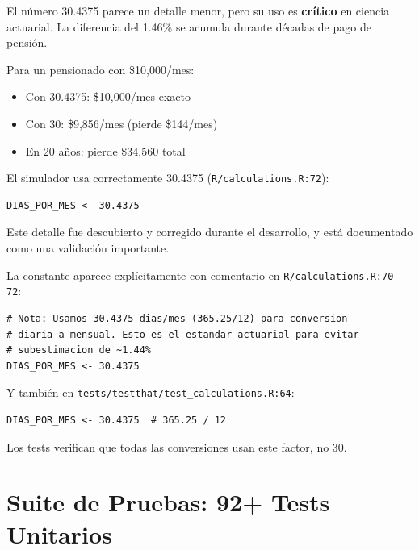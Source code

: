 \documentclass[11pt,a4paper]{report}
\begin{document}
\begin{tcolorbox}[colback=green!5!white, colframe=green!50!black, title=\textbf{Intuici\'on}]
El n\'umero 30.4375 parece un detalle menor, pero su uso es \textbf{cr\'itico} en ciencia actuarial. La diferencia del 1.46\% se acumula durante d\'ecadas de pago de pensi\'on.

Para un pensionado con \$10,000/mes:
\begin{itemize}
  \item Con 30.4375: \$10,000/mes exacto
  \item Con 30: \$9,856/mes (pierde \$144/mes)
  \item En 20 a\~nos: pierde \$34,560 total
\end{itemize}

El simulador usa correctamente 30.4375 (\texttt{R/calculations.R:72}):
\begin{lstlisting}
DIAS_POR_MES <- 30.4375
\end{lstlisting}

Este detalle fue descubierto y corregido durante el desarrollo, y est\'a documentado como una validaci\'on importante.
\end{tcolorbox}

\begin{tcolorbox}[colback=orange!5!white, colframe=orange!75!black, title=\textbf{Aplicaci\'on en C\'odigo}]
La constante aparece expl\'icitamente con comentario en \texttt{R/calculations.R:70--72}:
\begin{lstlisting}
# Nota: Usamos 30.4375 dias/mes (365.25/12) para conversion
# diaria a mensual. Esto es el estandar actuarial para evitar
# subestimacion de ~1.44%
DIAS_POR_MES <- 30.4375
\end{lstlisting}

Y tambi\'en en \texttt{tests/testthat/test\_calculations.R:64}:
\begin{lstlisting}
DIAS_POR_MES <- 30.4375  # 365.25 / 12
\end{lstlisting}

Los tests verifican que todas las conversiones usan este factor, no 30.
\end{tcolorbox}


\section{Suite de Pruebas: 92+ Tests Unitarios}
\end{document}
